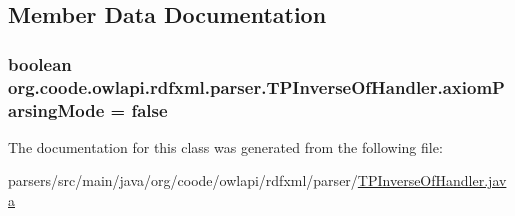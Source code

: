 \subsection{Member Data Documentation}
\hypertarget{classorg_1_1coode_1_1owlapi_1_1rdfxml_1_1parser_1_1_t_p_inverse_of_handler_a59ef1a5cbc6655336de1f8d2bd1d324d}{
\subsubsection[{axiom\-Parsing\-Mode}]{\setlength{\rightskip}{0pt plus 5cm}boolean org.\-coode.\-owlapi.\-rdfxml.\-parser.\-T\-P\-Inverse\-Of\-Handler.\-axiom\-Parsing\-Mode = false\hspace{0.3cm}{\ttfamily [private]}}}\label{classorg_1_1coode_1_1owlapi_1_1rdfxml_1_1parser_1_1_t_p_inverse_of_handler_a59ef1a5cbc6655336de1f8d2bd1d324d}


The documentation for this class was generated from the following file\-:\begin{DoxyCompactItemize}
\item 
parsers/src/main/java/org/coode/owlapi/rdfxml/parser/\hyperlink{_t_p_inverse_of_handler_8java}{T\-P\-Inverse\-Of\-Handler.\-java}\end{DoxyCompactItemize}
